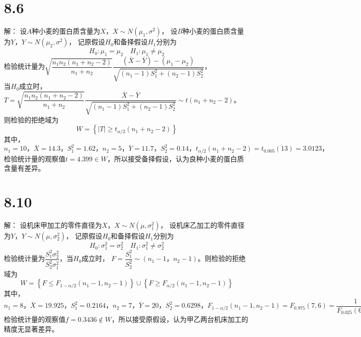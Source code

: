\documentclass[a4papers]{ctexart}
\begin{document}
\section{8.6}
解：
\indent 设$A$种小麦的蛋白质含量为$X$，$X \sim N(\mu_1,\sigma^2)$，
设$B$种小麦的蛋白质含量为$Y$，$Y \sim N(\mu_2,\sigma^2)$，
记原假设$H_0$和备择假设$H_1$分别为
\[
    H_0: \mu_1 =\mu_2 \quad H_1 :\mu_1 \ne \mu_2 
    \]
检验统计量为$\sqrt{\dfrac{n_1n_2(n_1+n_2-2)}{n_1+n_2}}\dfrac{(\overline X-\overline Y)-(\mu_1-\mu_2)}{\sqrt{(n_1-1)S_{1}^2+(n_2-1)S_{2}^2}}$，\\
当$H_0$成立时，
$T=\sqrt{\dfrac{n_1n_2(n_1+n_2-2)}{n_1+n_2}}\dfrac{\overline X-\overline Y}{\sqrt{(n_1-1)S_{1}^2+(n_2-1)S_{2}^2}}\sim t(n_1+n_2-2)$。\\
则检验的拒绝域为
\[
    W = \left\{ |T| \ge t_{\alpha /2}(n_1+n_2-2) \right\}
    \]
其中，$n_1 =10，\overline X=14.3，S_1^2=1.62，n_2=5，\overline Y = 11.7，S_2^2 = 0.14，t_{\alpha /2}(n_1+n_2-2)=t_{0.005}(13)=3.0123，$
检验统计量的观察值$t=4.399\in W，$所以接受备择假设，认为良种小麦的蛋白质含量有差异。

\section{8.10}
解：
\indent 设机床甲加工的零件直径为$X$，$X \sim N(\mu,\sigma_1^2)$，
设机床乙加工的零件直径为$Y$，$Y \sim N(\mu,\sigma_2^2)$，
记原假设$H_0$和备择假设$H_1$分别为
\[
    H_0: \sigma_1^2 = \sigma_2^2 \quad H_1 :\sigma_1^2 \ne \sigma_2^2
    \]
检验统计量为$\dfrac{S_1^2\sigma_2^2}{S_2^2\sigma_1^2}$，当$H_0$成立时，
$F=\dfrac{S_1^2}{S_2^2}\sim(n_1-1，n_2-1)$。则检验的拒绝域为
\[
    W = \left\{ F \le F_{1-\alpha/2}(n_1-1,n_2-1) \right\} \cup
        \left\{ F \ge F_{\alpha/2}(n_1-1,n_2-1) \right\}
    \]
其中，$n_1 =8，\overline X =19.925，S_1^2=0.2164，n_2=7，\overline Y = 20，S_2^2 = 0.6298，F_{1-\alpha /2}(n_1-1,n_2-1)=F_{0.975}(7,6)=\dfrac{1}{F_{0.025}(6,7)}=0.1953，F_{\alpha /2}(n_1-1,n_2-1)=F_{0.025}(7,6)=5.70$
检验统计量的观察值$f=0.3436 \notin W，$所以接受原假设，认为甲乙两台机床加工的精度无显著差异。
\end{document}
